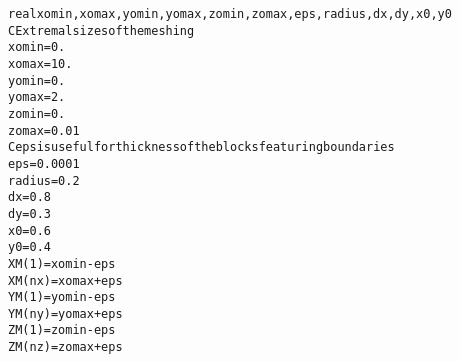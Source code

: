 \begin{alltt}
        real xomin,xomax,yomin,yomax,zomin,zomax,eps,radius,dx,dy, x0, y0
C       Extremal sizes of the meshing
        xomin=0.
        xomax=10.
        yomin=0.
        yomax=2.
        zomin=0.
        zomax=0.01
C       eps is useful for thickness of the blocks featuring boundaries
        eps=0.0001
        radius=0.2
        dx=0.8
        dy=0.3
        x0=0.6
        y0=0.4
        XM(1)=xomin-eps
        XM(nx)=xomax+eps
        YM(1)=yomin-eps
        YM(ny)=yomax+eps
        ZM(1)=zomin-eps
        ZM(nz)=zomax+eps
\end{alltt}
